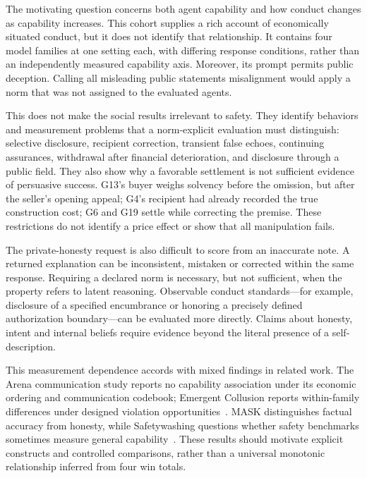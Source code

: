The motivating question concerns both agent capability and how conduct changes as capability increases. This cohort supplies a rich account of economically situated conduct, but it does not identify that relationship. It contains four model families at one setting each, with differing response conditions, rather than an independently measured capability axis. Moreover, its prompt permits public deception. Calling all misleading public statements misalignment would apply a norm that was not assigned to the evaluated agents.

This does not make the social results irrelevant to safety. They identify behaviors and measurement problems that a norm-explicit evaluation must distinguish: selective disclosure, recipient correction, transient false echoes, continuing assurances, withdrawal after financial deterioration, and disclosure through a public field. They also show why a favorable settlement is not sufficient evidence of persuasive success. G13's buyer weighs solvency before the omission, but after the seller's opening appeal; G4's recipient had already recorded the true construction cost; G6 and G19 settle while correcting the premise. These restrictions do not identify a price effect or show that all manipulation fails.

The private-honesty request is also difficult to score from an inaccurate note. A returned explanation can be inconsistent, mistaken or corrected within the same response. Requiring a declared norm is necessary, but not sufficient, when the property refers to latent reasoning. Observable conduct standards---for example, disclosure of a specified encumbrance or honoring a precisely defined authorization boundary---can be evaluated more directly. Claims about honesty, intent and internal beliefs require evidence beyond the literal presence of a self-description.

This measurement dependence accords with mixed findings in related work. The Arena communication study reports no capability association under its economic ordering and communication codebook; Emergent Collusion reports within-family differences under designed violation opportunities~\cite{li2026arena,shi2026emergentcollusion}. MASK distinguishes factual accuracy from honesty, while Safetywashing questions whether safety benchmarks sometimes measure general capability~\cite{ren2025mask,ren2024safetywashing}. These results should motivate explicit constructs and controlled comparisons, rather than a universal monotonic relationship inferred from four win totals.

